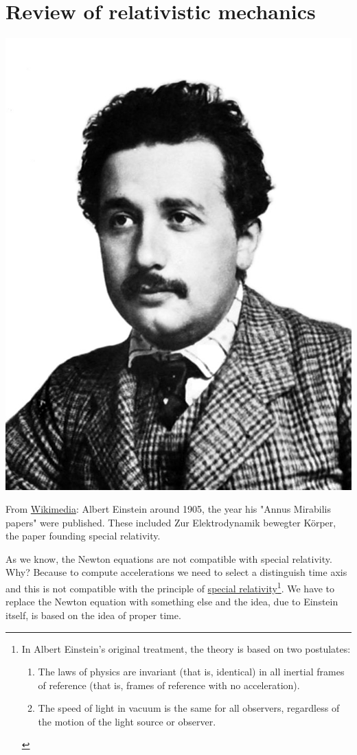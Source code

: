 \documentclass[../main.tex]{subfiles}
\begin{document}
\section{Review of relativistic mechanics}
\begin{marginfigure}
	\includegraphics[width=1\linewidth]{images/Einstein_patentoffice.jpg}
	\caption[Photo of Albert Einstein]{From \href{https://commons.wikimedia.org/wiki/File:Einstein_patentoffice.jpg}{Wikimedia}: Albert Einstein around 1905, the year his "Annus Mirabilis papers" were published. These included Zur Elektrodynamik bewegter Körper, the paper founding special relativity.}
\end{marginfigure}
As we know, the Newton equations are not compatible with special relativity. Why? Because to compute accelerations we need to select a distinguish time axis and this is not compatible with the principle of \href{https://it.wikipedia.org/wiki/Relativit\%C3\%A0_ristretta}{special relativity}\footnote{In Albert Einstein's original treatment, the theory is based on two postulates:
\begin{enumerate}
    \item The laws of physics are invariant (that is, identical) in all inertial frames of reference (that is, frames of reference with no acceleration).
    \item The speed of light in vacuum is the same for all observers, regardless of the motion of the light source or observer.
\end{enumerate}
}. We have to replace the Newton equation with something else and the idea, due to Einstein itself, is based on the idea of proper time.
\end{document}
